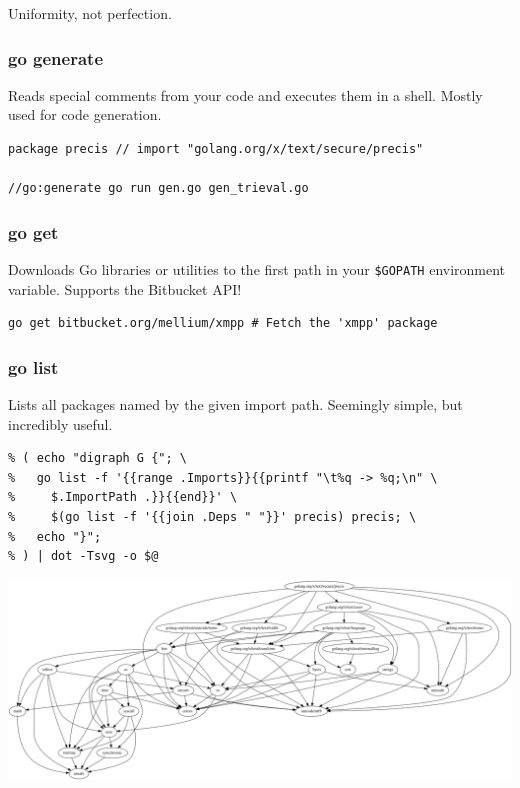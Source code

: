 \documentclass[xelatex,aspectratio=169]{beamer}
\begin{document}
\begin{frame}
	\begin{fancyquote}
		Uniformity, not perfection.
	\end{fancyquote}
\end{frame}

\begin{frame}[fragile]
	\frametitle{go generate}
	\begin{flushleft}
		Reads special comments from your code and executes them in a shell. Mostly
		used for code generation.
	\end{flushleft}
\begin{verbatim}
package precis // import "golang.org/x/text/secure/precis"

//go:generate go run gen.go gen_trieval.go
\end{verbatim}
\end{frame}

\begin{frame}[fragile]
	\frametitle{go get}
	\begin{flushleft}
		Downloads Go libraries or utilities to the first path in your
		\texttt{\$GOPATH} environment variable. Supports the Bitbucket API!
	\end{flushleft}
\begin{verbatim}
go get bitbucket.org/mellium/xmpp # Fetch the 'xmpp' package
\end{verbatim}
\end{frame}

\begin{frame}[fragile]
	\frametitle{go list}
	\begin{flushleft}
		Lists all packages named by the given import path. Seemingly simple, but
		incredibly useful.
	\end{flushleft}
\begin{verbatim}
% ( echo "digraph G {"; \
%   go list -f '{{range .Imports}}{{printf "\t%q -> %q;\n" \
%     $.ImportPath .}}{{end}}' \
%     $(go list -f '{{join .Deps " "}}' precis) precis; \
%   echo "}";
% ) | dot -Tsvg -o $@
\end{verbatim}
\end{frame}

\begin{frame}
\centerline{\includegraphics[width=\textwidth]{images/deps.svg.png}}
\end{frame}
\end{document}
